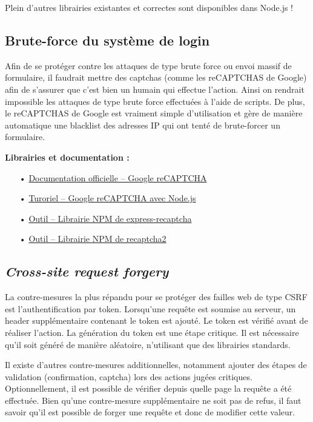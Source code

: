 Plein d'autres librairies existantes et correctes sont disponibles dans Node.js !
\clearpage

\subsection{Brute-force du système de login}
\label{ssec:cm-bruteforce}

Afin de se protéger contre les attaques de type brute force ou envoi massif de formulaire, il faudrait mettre des captchas (comme les reCAPTCHAS de Google) afin de s'assurer que c'est bien un humain qui effectue l'action. Ainsi on rendrait impossible les attaques de type brute force effectuées à l'aide de scripts. De plus, le reCAPTCHAS de Google est vraiment simple d'utilisation et gère de manière automatique une blacklist des adresses IP qui ont tenté de brute-forcer un formulaire.

\medskip
\textbf{Librairies et documentation :}

\begin{itemize}
\item[•] \href{https://www.google.com/recaptcha/intro/v3beta.html}{Documentation officielle -- Google reCAPTCHA}
\item[•] \href{https://codeforgeek.com/2016/03/google-recaptcha-node-js-tutorial/}{Turoriel -- Google reCAPTCHA avec Node.js}
\item[•] \href{https://www.npmjs.com/package/express-recaptcha}{Outil -- Librairie NPM de express-recaptcha}
\item[•] \href{https://www.npmjs.com/package/recaptcha2}{Outil -- Librairie NPM de recaptcha2}
\end{itemize}

\subsection{\emph{Cross-site request forgery}}
\label{ssec:cm-csrf}

La contre-mesures la plus répandu pour se protéger des failles web de type CSRF est l'authentification par token. Lorsqu'une requête est soumise au serveur, un header supplémentaire contenant le token est ajouté. Le token est vérifié avant de réaliser l'action. La génération du token est une étape critique. Il est nécessaire qu'il soit généré de manière aléatoire, n'utilisant que des librairies standards.

Il existe d'autres contre-mesures additionnelles, notamment ajouter des étapes de validation (confirmation, captcha) lors des actions jugées critiques. Optionnellement, il est possible de vérifier depuis quelle page la requête a été effectuée. Bien qu'une contre-mesure supplémentaire ne soit pas de refus, il faut savoir qu'il est possible de forger une requête et donc de modifier cette valeur.


